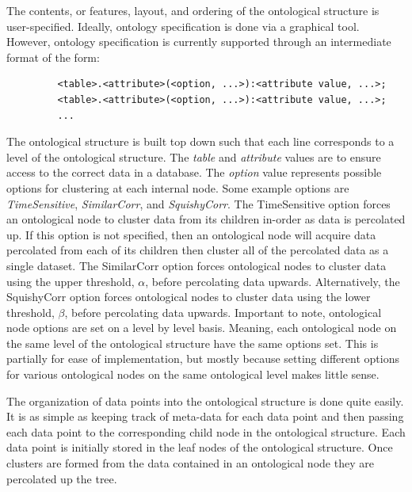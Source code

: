 \documentclass[12pt]{ucthesis}
\begin{document}
      The contents, or features, layout, and ordering of the ontological
      structure is user-specified. Ideally, ontology specification is done via
      a graphical tool. However, ontology specification is currently supported
      through an intermediate format of the form:
      \begin{verbatim}
         <table>.<attribute>(<option, ...>):<attribute value, ...>;
         <table>.<attribute>(<option, ...>):<attribute value, ...>;
         ...
      \end{verbatim}
      The ontological structure is built top down such that each line
      corresponds to a level of the ontological structure. The \textit{table}
      and \textit{attribute} values are to ensure access to the correct data in
      a database. The \textit{option} value represents possible options for
      clustering at each internal node. Some example options are
      \textit{TimeSensitive}, \textit{SimilarCorr}, and \textit{SquishyCorr}.
      The TimeSensitive option forces an ontological node to cluster data
      from its children in-order as data is percolated up. If this option is
      not specified, then an ontological node will acquire data percolated from
      each of its children then cluster all of the percolated data as a single
      dataset. The SimilarCorr option forces ontological nodes to cluster data
      using the upper threshold, $\alpha$, before percolating data upwards.
      Alternatively, the SquishyCorr option forces ontological nodes to cluster
      data using the lower threshold, $\beta$, before percolating data upwards.
      Important to note, ontological node options are set on a level by level
      basis. Meaning, each ontological node on the same level of the
      ontological structure have the same options set. This is partially for
      ease of implementation, but mostly because setting different options for
      various ontological nodes on the same ontological level makes little
      sense.

      The organization of data points into the ontological structure is done
      quite easily. It is as simple as keeping track of meta-data for each data
      point and then passing each data point to the corresponding child node in
      the ontological structure. Each data point is initially stored in the
      leaf nodes of the ontological structure. Once clusters are formed from
      the data contained in an ontological node they are percolated up the
      tree.
\end{document}
